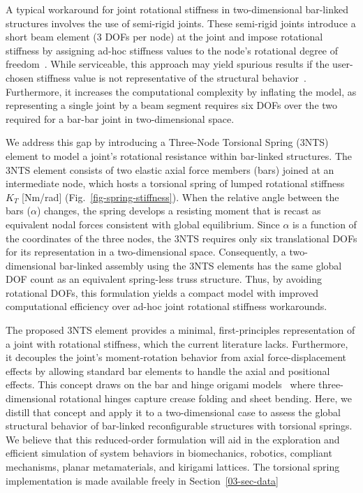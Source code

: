 A typical workaround for joint rotational stiffness in two-dimensional bar-linked structures involves the use of semi-rigid joints. These semi-rigid joints introduce a short beam element (3 DOFs per node) at the joint and impose rotational stiffness by assigning ad-hoc stiffness values to the node's rotational degree of freedom~\cite{wasfy1996torsional,kartal2010effects, yao2023dynamic,molina2023closed}. While serviceable, this approach may yield spurious results if the user-chosen stiffness value is not representative of the structural behavior~\cite{mohammed2019effect}. Furthermore, it increases the computational complexity by inflating the model, as representing a single joint by a beam segment requires six DOFs over the two required for a bar-bar joint in two-dimensional space.

We address this gap by introducing a Three-Node Torsional Spring (3NTS) element to model a joint's rotational resistance within bar-linked structures. The 3NTS element consists of two elastic axial force members (bars) joined at an intermediate node, which hosts a torsional spring of lumped rotational stiffness \(K_T\) [Nm/rad] (Fig.~\ref{fig-spring-stiffness}). When the relative angle between the bars (\(\alpha{}\)) changes, the spring develops a resisting moment that is recast as equivalent nodal forces consistent with global equilibrium. Since \(\alpha{}\) is a function of the coordinates of the three nodes, the 3NTS requires only six translational DOFs for its representation in a two-dimensional space. Consequently, a two-dimensional bar-linked assembly using the 3NTS elements has the same global DOF count as an equivalent spring-less truss structure. Thus, by avoiding rotational DOFs, this formulation yields a compact model with improved computational efficiency over ad-hoc joint rotational stiffness workarounds.

The proposed 3NTS element provides a minimal, first-principles representation of a joint with rotational stiffness, which the current literature lacks. Furthermore, it decouples the joint's moment-rotation behavior from axial force-displacement effects by allowing standard bar elements to handle the axial and positional effects. This concept draws on the bar and hinge origami models~\cite{schenk2011origami,liu2017merlin,filipov2017bar,woodruff2020bar} where three-dimensional rotational hinges capture crease folding and sheet bending. Here, we distill that concept and apply it to a two-dimensional case to assess the global structural behavior of bar-linked reconfigurable structures with torsional springs. We believe that this reduced-order formulation will aid in the exploration and efficient simulation of system behaviors in biomechanics, robotics, compliant mechanisms, planar metamaterials, and kirigami lattices. The torsional spring implementation is made available freely in Section~\ref{03-sec-data}

